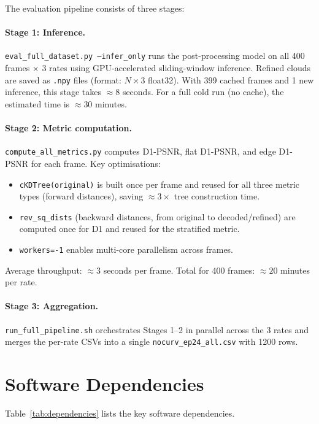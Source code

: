 The evaluation pipeline consists of three stages:

\paragraph{Stage 1: Inference.}
\texttt{eval\_full\_dataset.py --infer\_only} runs the post-processing model
on all 400 frames $\times$ 3 rates using GPU-accelerated sliding-window
inference.
Refined clouds are saved as \texttt{.npy} files
(format: $N \times 3$ float32).
With 399 cached frames and 1 new inference, this stage takes $\approx 8$ seconds.
For a full cold run (no cache), the estimated time is $\approx 30$ minutes.

\paragraph{Stage 2: Metric computation.}
\texttt{compute\_all\_metrics.py} computes D1-PSNR, flat D1-PSNR, and edge
D1-PSNR for each frame.
Key optimisations:
\begin{itemize}
  \item \texttt{cKDTree(original)} is built once per frame and reused for all
    three metric types (forward distances), saving $\approx 3\times$ tree
    construction time.
  \item \texttt{rev\_sq\_dists} (backward distances, from original to decoded/refined)
    are computed once for D1 and reused for the stratified metric.
  \item \texttt{workers=-1} enables multi-core parallelism across frames.
\end{itemize}
Average throughput: $\approx 3$ seconds per frame.
Total for 400 frames: $\approx 20$ minutes per rate.

\paragraph{Stage 3: Aggregation.}
\texttt{run\_full\_pipeline.sh} orchestrates Stages 1--2 in parallel across
the 3 rates and merges the per-rate CSVs into a single
\texttt{nocurv\_ep24\_all.csv} with 1200 rows.

\section{Software Dependencies}
\label{app:dependencies}

Table~\ref{tab:dependencies} lists the key software dependencies.

